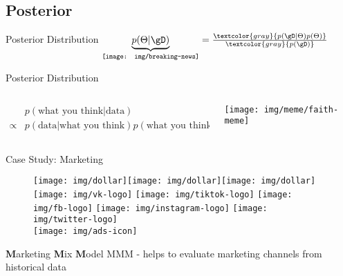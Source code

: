 \documentclass{beamer}
\begin{document}
\subsection{Posterior}
\begin{frame}{Posterior Distribution}
\center \Huge $\underbrace{p(\Theta|\gD)}_{\text{\texttt{[image: img/breaking-news]}}}
    =\frac{
        \textcolor{gray}{p(\gD|\Theta)p(\Theta)}
        }{
        \textcolor{gray}{p(\gD)}
        }$
\end{frame}
\begin{frame}{Posterior Distribution}
\begin{columns}
\begin{column}{0.75\linewidth}
\begin{align*}
&p(\text{what you think}|\text{data})\\
\propto &p(\text{data} |\text{what you think})p(\text{what you think})
\end{align*}
\end{column}
\begin{column}{0.25\linewidth}
\texttt{[image: img/meme/faith-meme]}
\end{column}
\end{columns}
\end{frame}
\begin{frame}{Case Study: Marketing}
    \begin{figure}
    \centering
    \texttt{[image: img/dollar]}\texttt{[image: img/dollar]}\texttt{[image: img/dollar]}\\
        \texttt{[image: img/vk-logo]}
        \texttt{[image: img/tiktok-logo]}
        \texttt{[image: img/fb-logo]}
        \texttt{[image: img/instagram-logo]}
        \texttt{[image: img/twitter-logo]}\\
        \texttt{[image: img/ads-icon]}
    \end{figure}
\begin{block}{\textbf{M}arketing \textbf{M}ix \textbf{M}odel}
    MMM - helps to evaluate marketing channels from historical data
\end{block}
\end{frame}
\end{document}

